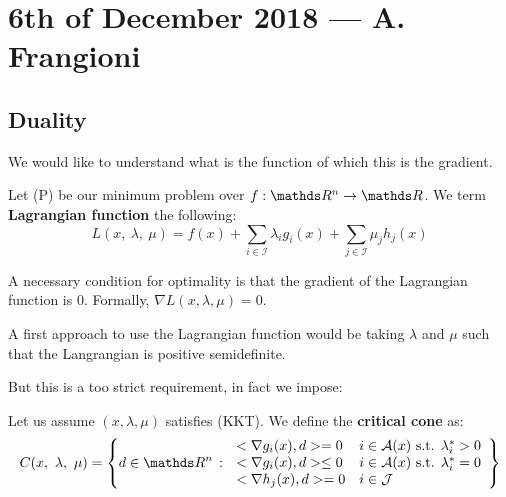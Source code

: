 \documentclass[ComputationalMathematics.tex]{subfiles}
\begin{document}
\section{6th of December 2018 --- A. Frangioni}

\subsection{Duality}

We would like to understand what is the function of which this is the gradient.

\begin{definition}
  Let (P) be our minimum problem over $f: \R^n \to \R$. We term \textbf{Lagrangian function} the following:
  \[
    L(x,~\lambda,~\mu) = f(x) + \sum_{i \in \mathcal{I}} \lambda_i g_i(x) +\sum_{j \in \mathcal{I}} \mu_j h_j(x)
  \]
\end{definition}

\begin{proposition}
A necessary condition for optimality is that the gradient of the Lagrangian function is $0$.
  Formally, $\nabla L(x, \lambda, \mu) = 0$.
\end{proposition}

A first approach to use the Lagrangian function would be taking $\lambda$ and $\mu$ such that the Langrangian is positive semidefinite.

But this is a too strict requirement, in fact we impose:

\begin{definition}
  Let us assume $(x,\lambda,\mu)$ satisfies (KKT). We define the \textbf{critical cone} as:
       \[
        C(x,~\lambda,~\mu) =
        \left\{ d\in\R^n \,:\,
        \begin{array}{ll}
         \ps{\nabla g_i(x)}{d} = 0 &
         i \in \mathcal{A}(x) \mbox{ s.t. } \lambda^*_i > 0\\
         \ps{\nabla g_i(x)}{d} \leq 0 &
         i \in \mathcal{A}(x) \mbox{ s.t. } \lambda^*_i = 0\\
         \ps{\nabla h_j(x)}{d} = 0 & i \in \mathcal{J}
        \end{array}\right\}
       \]
\end{definition}
\end{document}
